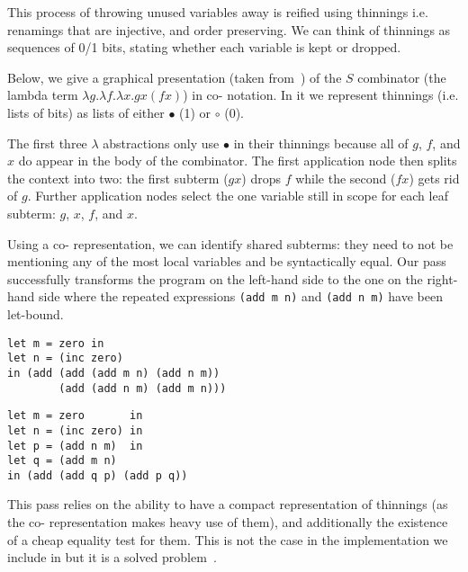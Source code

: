 This process of throwing unused variables away is reified using thinnings
i.e. renamings that are injective, and order preserving.
%
We can think of thinnings as sequences of 0/1 bits, stating whether each variable
is kept or dropped.

Below, we give a graphical presentation (taken from~\cite{MANUAL:draft/Allais22})
of the $S$ combinator (the lambda term $\lambda g. \lambda f. \lambda x. g x (f x)$)
in co-\DeBruijn{} notation.
%
In it we represent thinnings (i.e. lists of bits) as lists of either
$\bullet$ (1) or $\circ$ (0).

\begin{center}
  \codebruijnexamplegraph{}
\end{center}

The first three $\lambda$ abstractions only use $\bullet$ in their
thinnings because all of $g$, $f$, and $x$ do appear in the body of the combinator.
%
The first application node then splits the context into two:
the first subterm ($g x$) drops $f$
while the second ($f x$) gets rid of $g$.
%
Further application nodes select the one variable still in scope for each leaf subterm: $g$, $x$, $f$, and $x$.

Using a co-\DeBruijn{} representation, we can identify shared subterms:
%
they need to not be mentioning any of the most local variables and be syntactically equal.
%
Our pass successfully transforms the program on the left-hand side to the one
on the right-hand side where the repeated expressions \texttt{(add m n)}
and \texttt{(add n m)} have been let-bound.

\begin{center}
  \begin{minipage}[t]{0.4\textwidth}
    \begin{Verbatim}
let m = zero in
let n = (inc zero)
in (add (add (add m n) (add n m))
        (add (add n m) (add m n)))
    \end{Verbatim}
  \end{minipage}\hfill\begin{minipage}[t]{0.4\textwidth}
    \begin{Verbatim}
let m = zero       in
let n = (inc zero) in
let p = (add n m)  in
let q = (add m n)
in (add (add q p) (add p q))
    \end{Verbatim}
  \end{minipage}
\end{center}

This pass relies on the ability to have a compact representation of thinnings
(as the co-\DeBruijn{} representation makes heavy use of them),
and additionally the existence of a cheap equality test for them.
%
This is not the case in the implementation we include in \Velo{} but
it is a solved problem~\cite{MANUAL:draft/Allais22}.
